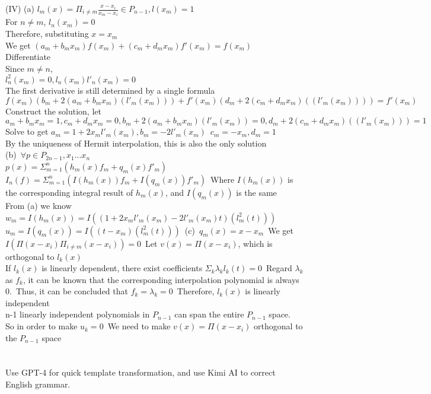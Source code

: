 \documentclass[a4paper]{article}
\begin{document}
(IV)
(a)
\(l_m(x)=\Pi_{i\neq m}\frac{x-x_i}{x_m-x_i} \in P_{n-1},l(x_m)=1\)\\
For \(n\neq m\), \(l_n(x_m)=0\)\\
Therefore, substituting \(x=x_m\)\\
We get \((a_m+b_mx_m)f(x_m)+(c_m+d_mx_m)f'(x_m)=f(x_m)\)\\
Differentiate\\
Since \(m\neq n\),\\
\(l^2_n(x_m)=0,l_n(x_m)l'_n(x_m)=0\)\\
The first derivative is still determined by a single formula\\
\(f(x_m)(b_m+2(a_m+b_mx_m)(l'_m(x_m)))+f'(x_m)(d_m+2(c_m+d_mx_m)((l'_m(x_m))))=f'(x_m)\)
Construct the solution, let\\
\(a_m+b_mx_m=1,c_m+d_mx_m=0,b_m+2(a_m+b_mx_m)(l'_m(x_m))=0,d_m+2(c_m+d_mx_m)((l'_m(x_m)))=1\)\\
Solve to get \(a_m=1+2x_ml'_m(x_m),b_m=-2l'_m(x_m)\)\
\(c_m=-x_m,d_m=1\)\\
By the uniqueness of Hermit interpolation, this is also the only solution\\
(b)\
\(\forall p \in P_{2n-1},x_1...x_n\)\\
\(p(x)=\Sigma_{m=1}^{n}(h_m(x)f_m+q_m(x)f'_m)\)\
\(I_n(f)=\Sigma_{m=1}^{n}(I(h_m(x)) f_m+I(q_m(x))f'_m)\)\
Where \(I(h_m(x))\) is the corresponding integral result of \(h_m(x)\), and \(I(q_m(x))\) is the same\\
From (a) we know\\
\(w_m=I(h_m(x))=I((1+2x_ml'_m(x_m)-2l'_m(x_m)t)(l_m^2(t)))\)\
\(u_m=I(q_m(x))=I((t-x_m)(l_m^2(t)))\)\
(c)\
\(q_m(x)=x-x_m\)\
We get \(I(\Pi(x-x_i)\Pi_{i\neq m}(x-x_i))=0\)\
Let \(v(x)=\Pi(x-x_i)\), which is orthogonal to \(l_k(x)\)\\
If \(l_k(x)\) is linearly dependent, there exist coefficients \(\Sigma_{k}\lambda_kl_k(t)=0\)\
Regard \(\lambda_k\) as \(f_k\), it can be known that the corresponding interpolation polynomial is always 0.\
Thus, it can be concluded that \(f_k=\lambda_k=0\)\
Therefore, \(l_k(x)\) is linearly independent\\
n-1 linearly independent polynomials in \(P_{n-1}\) can span the entire \(P_{n-1}\) space.\\
So in order to make \(u_k=0\)\
We need to make \(v(x)=\Pi(x-x_i)\) orthogonal to the \(P_{n-1}\) space\\
\section*{ \center{\normalsize {Acknowledgement}} }
Use GPT-4 for quick template transformation, and use Kimi AI to correct English grammar.
\end{document}

